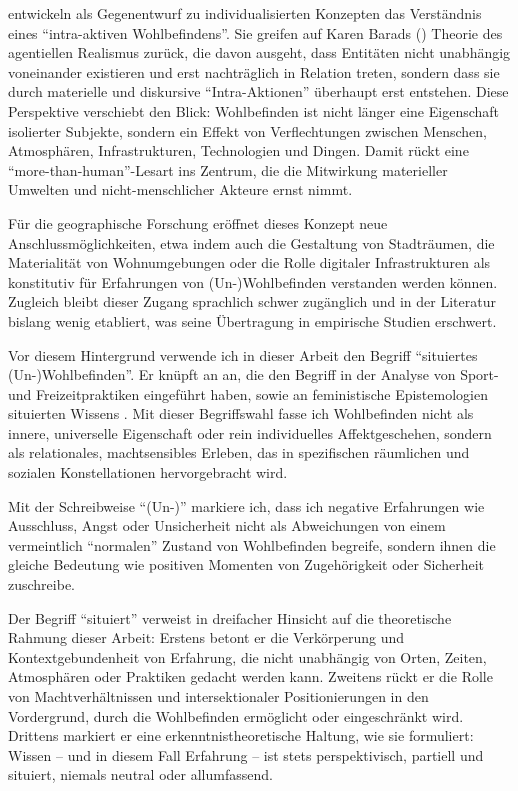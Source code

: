\textcite{smithWhichBeingWellbeing2018} entwickeln als Gegenentwurf zu individualisierten Konzepten das Verständnis eines \enquote{intra-aktiven Wohlbefindens}. Sie greifen auf Karen Barads (\citeyear{baradMeetingUniverseHalfway2007}) Theorie des agentiellen Realismus zurück, die davon ausgeht, dass Entitäten nicht unabhängig voneinander existieren und erst nachträglich in Relation treten, sondern dass sie durch materielle und diskursive \enquote{Intra-Aktionen} überhaupt erst entstehen. Diese Perspektive verschiebt den Blick: Wohlbefinden ist nicht länger eine Eigenschaft isolierter Subjekte, sondern ein Effekt von Verflechtungen zwischen Menschen, Atmosphären, Infrastrukturen, Technologien und Dingen. Damit rückt eine \enquote{more-than-human}-Lesart ins Zentrum, die die Mitwirkung materieller Umwelten und nicht-menschlicher Akteure ernst nimmt. 

Für die geographische Forschung eröffnet dieses Konzept neue Anschlussmöglichkeiten, etwa indem auch die Gestaltung von Stadträumen, die Materialität von Wohnumgebungen oder die Rolle digitaler Infrastrukturen als konstitutiv für Erfahrungen von (Un\nobreakdash-)Wohl\-be\-find\-en verstanden werden können. Zugleich bleibt dieser Zugang sprachlich schwer zugänglich und in der Literatur bislang wenig etabliert, was seine Übertragung in empirische Studien erschwert.

Vor diesem Hintergrund verwende ich in dieser Arbeit den Begriff \enquote{situiertes (Un\nobreakdash-)Wohl\-be\-find\-en}. Er knüpft an \textcite{leeUnderstandingDisruptedParticipation2021} an, die den Begriff in der Analyse von Sport- und Freizeitpraktiken eingeführt haben, sowie an feministische Epistemologien situierten Wissens \parencite{harawaySituatedKnowledgesScience1988}. Mit dieser Begriffswahl fasse ich Wohlbefinden nicht als innere, universelle Eigenschaft oder rein individuelles Affektgeschehen, sondern als relationales, machtsensibles Erleben, das in spezifischen räumlichen und sozialen Konstellationen hervorgebracht wird. 

Mit der Schreibweise \enquote{(Un\nobreakdash-)} markiere ich, dass ich negative Erfahrungen wie Ausschluss, Angst oder Unsicherheit nicht als Abweichungen von einem vermeintlich \enquote{normalen} Zustand von Wohlbefinden begreife, sondern ihnen die gleiche Bedeutung wie positiven Momenten von Zugehörigkeit oder Sicherheit zuschreibe.

Der Begriff \enquote{situiert} verweist in dreifacher Hinsicht auf die theoretische Rahmung dieser Arbeit: Erstens betont er die Verkörperung und Kontextgebundenheit von Erfahrung, die nicht unabhängig von Orten, Zeiten, Atmosphären oder Praktiken gedacht werden kann. Zweitens rückt er die Rolle von Machtverhältnissen und intersektionaler Positionierungen in den Vordergrund, durch die Wohlbefinden ermöglicht oder eingeschränkt wird. Drittens markiert er eine erkenntnistheoretische Haltung, wie sie \textcite{harawaySituatedKnowledgesScience1988} formuliert: Wissen -- und in diesem Fall Erfahrung -- ist stets perspektivisch, partiell und situiert, niemals neutral oder allumfassend. 

